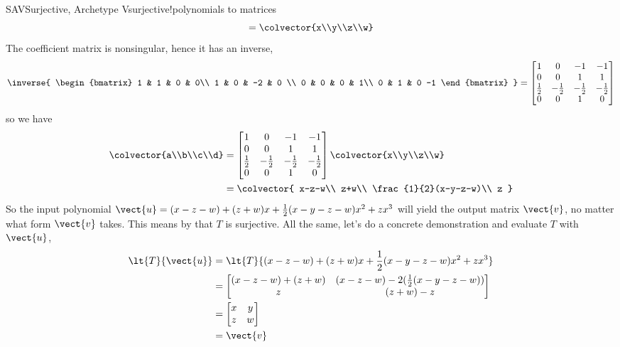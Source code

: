 \begin{example}{SAV}{Surjective, Archetype V}{surjective!polynomials to matrices}
\begin{equation*}
=
\colvector{x\\y\\z\\w}
\end{equation*}
%
The coefficient matrix is nonsingular, hence it has an inverse,
%
\begin{equation*}
\inverse{
\begin{bmatrix}
1 & 1 & 0 & 0\\
1 & 0 & -2 & 0 \\
0 & 0 & 0 & 1\\
0 & 1 & 0 -1
\end{bmatrix}
}
=
\begin{bmatrix}
1 & 0 & -1 & -1\\
0 & 0 & 1 & 1\\
\frac{1}{2} & -\frac{1}{2} & -\frac{1}{2} & -\frac{1}{2}\\
0 & 0 & 1 & 0
\end{bmatrix}
\end{equation*}
%
so we have
%
\begin{align*}
\colvector{a\\b\\c\\d}&=
\begin{bmatrix}
1 & 0 & -1 & -1\\
0 & 0 & 1 & 1\\
\frac{1}{2} & -\frac{1}{2} & -\frac{1}{2} & -\frac{1}{2}\\
0 & 0 & 1 & 0
\end{bmatrix}
\colvector{x\\y\\z\\w}\\%
&=
\colvector{
x-z-w\\
z+w\\
\frac{1}{2}(x-y-z-w)\\
z
}
%
\end{align*}
%
So the input polynomial $\vect{u}=(x-z-w)+(z+w)x+\frac{1}{2}(x-y-z-w)x^2+zx^3$ will yield the output matrix $\vect{v}$, no matter what form $\vect{v}$ takes.  This means by  that $T$ is surjective.  All the same, let's do a concrete demonstration and evaluate $T$ with $\vect{u}$,
%
\begin{align*}
\lt{T}{\vect{u}}&=\lt{T}{(x-z-w)+(z+w)x+\frac{1}{2}(x-y-z-w)x^2+zx^3}\\
%
&=
\begin{bmatrix}
(x-z-w)+(z+w) & (x-z-w) - 2(\frac{1}{2}(x-y-z-w))\\
z & (z+w)-z
\end{bmatrix}\\
%
&=
\begin{bmatrix}
x & y\\
z & w
\end{bmatrix}\\
&=\vect{v}
%
\end{align*}
%
\end{example}
